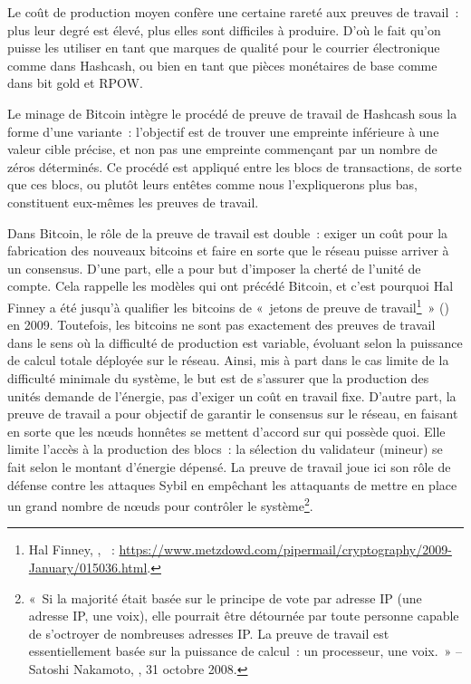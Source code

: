 Le coût de production moyen confère une certaine rareté aux preuves de travail~: plus leur degré est élevé, plus elles sont difficiles à produire. D'où le fait qu'on puisse les utiliser en tant que marques de qualité pour le courrier électronique comme dans Hashcash, ou bien en tant que pièces monétaires de base comme dans bit gold et RPOW.


Le minage de Bitcoin intègre le procédé de preuve de travail de Hashcash sous la forme d'une variante~: l'objectif est de trouver une empreinte inférieure à une valeur cible précise, et non pas une empreinte commençant par un nombre de zéros déterminés. Ce procédé est appliqué entre les blocs de transactions, de sorte que ces blocs, ou plutôt leurs entêtes comme nous l'expliquerons plus bas, constituent eux-mêmes les preuves de travail.

Dans Bitcoin, le rôle de la preuve de travail est double~: exiger un coût pour la fabrication des nouveaux bitcoins et faire en sorte que le réseau puisse arriver à un consensus. D'une part, elle a pour but d'imposer la cherté de l'unité de compte. Cela rappelle les modèles qui ont précédé Bitcoin, et c'est pourquoi Hal Finney a été jusqu'à qualifier les bitcoins de «~jetons de preuve de travail\footnote{Hal Finney, , ~: \url{https://www.metzdowd.com/pipermail/cryptography/2009-January/015036.html}.}~» () en 2009. Toutefois, les bitcoins ne sont pas exactement des preuves de travail dans le sens où la difficulté de production est variable, évoluant selon la puissance de calcul totale déployée sur le réseau. Ainsi, mis à part dans le cas limite de la difficulté minimale du système, le but est de s'assurer que la production des unités demande de l'énergie, pas d'exiger un coût en travail fixe. D'autre part, la preuve de travail a pour objectif de garantir le consensus sur le réseau, en faisant en sorte que les nœuds honnêtes se mettent d'accord sur qui possède quoi. Elle limite l'accès à la production des blocs~: la sélection du validateur (mineur) se fait selon le montant d'énergie dépensé. La preuve de travail joue ici son rôle de défense contre les attaques Sybil en empêchant les attaquants de mettre en place un grand nombre de nœuds pour contrôler le système\footnote{«~Si la majorité était basée sur le principe de vote par adresse IP (une adresse IP, une voix), elle pourrait être détournée par toute personne capable de s'octroyer de nombreuses adresses IP. La preuve de travail est essentiellement basée sur la puissance de calcul~: un processeur, une voix.~» -- Satoshi Nakamoto, , 31 octobre 2008.}.


